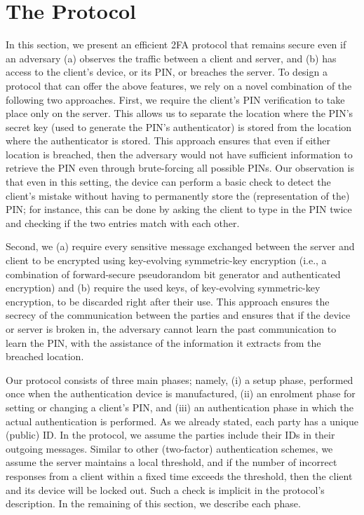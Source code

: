 \documentclass[runningheads]{llncs}
\begin{document}
\section{The Protocol}\label{sec::the-protocol}
\vspace{-3mm}

In this section, we present an efficient 2FA protocol that remains secure even if an adversary (a) observes the traffic between a client and server, and (b) has access to the client’s device, or its PIN, or breaches the server. To design a protocol that can offer the above features, we rely on a novel combination of the following two approaches. First, we require the client's  PIN verification to take place only on the server. This allows us to separate the location where the PIN's secret key (used to generate the PIN's authenticator) is stored from the location where the authenticator is stored. This approach ensures that even if either location is breached, then the adversary would not have sufficient information to retrieve the PIN even through brute-forcing all possible PINs. Our observation is that even in this setting, the device can perform a basic check to detect the client's mistake without having to permanently store the (representation of the) PIN; for instance, this can be done by asking the client to type in the PIN twice and checking if the two entries match with each other. 



Second, we (a) require every sensitive message exchanged between the server and client to be encrypted using key-evolving symmetric-key encryption (i.e., a combination of forward-secure pseudorandom bit generator and authenticated encryption) and (b) require the used keys, of key-evolving symmetric-key encryption, to be discarded right after their use. This approach ensures the secrecy of the communication between the parties and ensures that if the device or server is broken in, the adversary cannot learn the past communication to learn the PIN, with the assistance of the information it extracts from the breached location. 



Our protocol consists of three main phases; namely, (i) a setup phase, performed once when the authentication device is manufactured, (ii) an enrolment phase for setting or changing a client's PIN, and (iii) an authentication phase in which the actual authentication is performed. As we already stated, each party has a unique (public) ID. In the protocol, we assume the parties include their IDs in their outgoing messages.  Similar to other (two-factor) authentication schemes, we assume the server maintains a local threshold, and if the number of incorrect responses from a client within a fixed time exceeds the threshold, then the client and its device will be locked out. Such a check is implicit in the protocol's description. In the remaining of this section, we describe each phase. 
\end{document}
